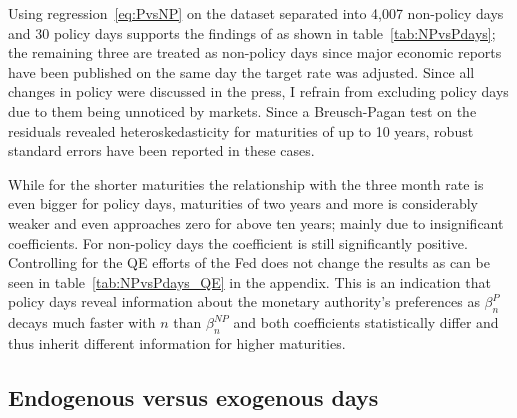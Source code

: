 Using regression~\eqref{eq:PvsNP} on the dataset separated into 4,007 non-policy days and 30 policy days supports the findings of \textcite{Ellingsen.2003} as shown in table~\vref{tab:NPvsPdays}; the remaining three are treated as non-policy days since major economic reports have been published on the same day the target rate was adjusted. Since all changes in policy were discussed in the press, I refrain from excluding policy days due to them being unnoticed by markets. Since a Breusch-Pagan test on the residuals revealed heteroskedasticity for maturities of up to 10 years, robust standard errors have been reported in these cases.

%
While for the shorter maturities the relationship with the three month rate is even bigger for policy days, maturities of two years and more is considerably weaker and even approaches zero for above ten years; mainly due to insignificant coefficients. For non-policy days the coefficient is still significantly positive. Controlling for the QE efforts of the Fed does not change the results as can be seen in table~\vref{tab:NPvsPdays_QE} in the appendix. This is an indication that policy days reveal information about the monetary authority's preferences as $\beta_n^{P}$ decays much faster with $n$ than $\beta_n^{NP}$ and both coefficients statistically differ and thus inherit different information for higher maturities.

\subsection{Endogenous versus exogenous days}

